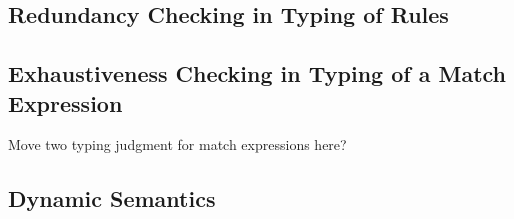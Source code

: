 \documentclass[runningheads,envcountsame,a4paper]{llncs}
\begin{document}
\subsection{Redundancy Checking in Typing of Rules}


\subsection{Exhaustiveness Checking in Typing of a Match Expression}
Move two typing judgment for match expressions here?
\subsection{Dynamic Semantics}


\clearpage



\end{document}
